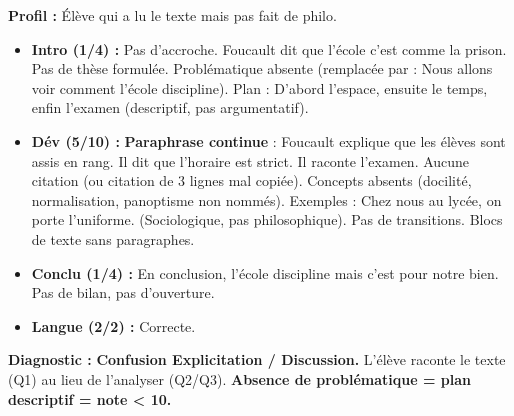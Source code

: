 \documentclass[11pt]{article}
\newcommand{\cle}[1]{{\popxbold\color{popdark}#1}}
\begin{document}
\begin{exemplebox}
\textbf{Profil :} \'El\`eve qui a \og{}lu le texte\fg{} mais pas \og{}fait de philo\fg{}.
\begin{itemize}
    \item \textbf{Intro (1/4) :} Pas d'accroche. \og{}Foucault dit que l'\'ecole c'est comme la prison.\fg{} Pas de th\`ese formul\'ee. Probl\'ematique absente (remplac\'ee par : \og{}Nous allons voir comment l'\'ecole discipline\fg{}). Plan : \og{}D'abord l'espace, ensuite le temps, enfin l'examen\fg{} (descriptif, pas argumentatif).
    \item \textbf{D\'ev (5/10) :} \textbf{Paraphrase continue} : \og{}Foucault explique que les \'el\`eves sont assis en rang. Il dit que l'horaire est strict. Il raconte l'examen.\fg{} Aucune citation (ou citation de 3 lignes mal copi\'ee). Concepts absents (\cle{docilit\'e}, \cle{normalisation}, \cle{panoptisme} non nomm\'es). Exemples : \og{}Chez nous au lyc\'ee, on porte l'uniforme.\fg{} (Sociologique, pas philosophique). Pas de transitions. Blocs de texte sans paragraphes.
    \item \textbf{Conclu (1/4) :} \og{}En conclusion, l'\'ecole discipline mais c'est pour notre bien.\fg{} Pas de bilan, pas d'ouverture.
    \item \textbf{Langue (2/2) :} Correcte.
\end{itemize}
\textbf{Diagnostic :} \textbf{Confusion Explicitation / Discussion.} L'\'el\`eve raconte le texte (Q1) au lieu de l'analyser (Q2/Q3). \textbf{Absence de probl\'ematique = plan descriptif = note < 10.}
\end{exemplebox}
\end{document}
